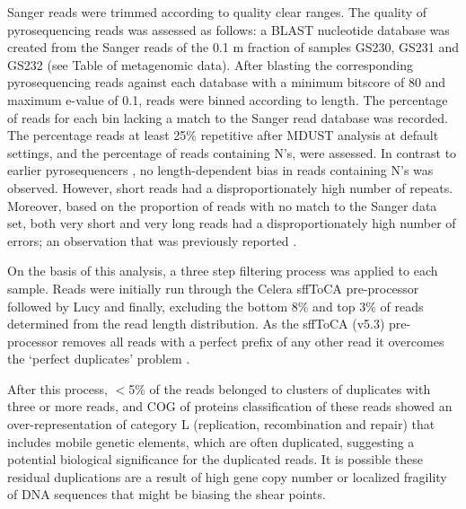 Sanger reads were trimmed according to quality clear ranges.
The quality of pyrosequencing reads was assessed as follows: 
a \ac{BLAST} nucleotide database was created from the Sanger reads of the 0.1 \textmu{}m fraction of samples GS230, GS231 and GS232 (see Table of metagenomic data). %
After blasting the corresponding pyrosequencing reads against each database with a minimum bitscore of 80 and maximum e-value of 0.1, reads were binned according to length.
The percentage of reads for each bin lacking a match to the Sanger read database was recorded. 
The percentage reads at least 25\% repetitive after MDUST \cite{Morgulis2006} analysis at default settings, and the percentage of reads containing N's, were assessed. 
In contrast to earlier pyrosequencers \cite{Huse2007}, no length-dependent bias in reads containing N's was observed. 
However, short reads had a disproportionately high number of repeats. 
Moreover, based on the proportion of reads with no match to the Sanger data set, both very short and very long reads had a disproportionately high number of errors; an observation that was previously reported \cite{Huse2007}.

On the basis of this analysis, a three step filtering process was applied to each sample. 
Reads were initially run through the Celera sffToCA \cite{Miller2008} pre-processor followed by Lucy \cite{Chou2001} and finally, excluding the bottom 8\% and top 3\% of reads determined from the read length distribution. 
As the sffToCA (v5.3) pre-processor removes all reads with a perfect prefix of any other read it overcomes the `perfect duplicates’ problem \cite{Gomez-Alvarez2009}.
 
After this process, $<$5\% of the reads belonged to clusters of duplicates with three or more reads, and \ac{COG} of proteins classification of these reads showed an over-representation of category L (replication, recombination and repair) that includes mobile genetic elements, which are often duplicated, suggesting a potential biological significance for the duplicated reads. 
It is possible these residual duplications are a result of high gene copy number or localized fragility of DNA sequences that might be biasing the shear points.

